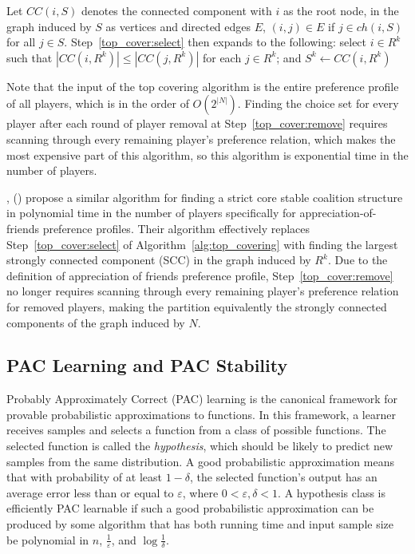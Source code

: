\documentclass[letterpaper]{article} %
\newcommand{\citename}[1]{\citeauthor{#1}, (\citeyear{#1})}
\newcommand{\ch}{\mathit{ch}}
\newcommand{\CC}{\mathit{CC}}
\theoremstyle{definition}
\begin{document}
Let $\CC(i, S)$ denotes the connected component with $i$ as the root node,
in the graph induced by $S$ as vertices and directed edges $E$,
$(i, j) \in E$ if $j \in \ch(i, S)$ for all $j \in S$.
Step~\ref{top_cover:select} then expands to the following: select $i\in R^k$ such that $|\CC(i,R^k)| \leq |\CC(j,R^k)|$ for each $j\in R^k$; and $S^k\leftarrow \CC(i,R^k)$

Note that the input of the top covering algorithm is the entire preference profile of all players, which is in the order of $O(2^{|N|})$. Finding the choice set for every player after each round of player removal at Step~\ref{top_cover:remove} requires scanning through every remaining player's preference relation, which makes the most expensive part of this algorithm, so this algorithm is exponential time in the number of players.

\citename{Dimitrov2006} propose a similar algorithm for finding a strict core stable coalition structure in polynomial time in the number of players specifically for appreciation-of-friends preference profiles. Their algorithm effectively replaces Step~\ref{top_cover:select} of Algorithm~\ref{alg:top_covering} with finding the largest strongly connected component (SCC) in the graph induced by $R^k$. Due to the definition of appreciation of friends preference profile, Step~\ref{top_cover:remove} no longer requires scanning through every remaining player's preference relation for removed players, making the partition equivalently the strongly connected components of the graph induced by $N$.

\subsection{PAC Learning and PAC Stability}
Probably Approximately Correct (PAC) learning is the canonical framework for provable probabilistic approximations to functions. In this framework, a learner receives samples and selects a function from a class of possible functions. The selected function is called the {\it hypothesis}, which should be likely to predict new samples from the same distribution. A good probabilistic approximation means that with probability of at least $1 - \delta$, the selected function's output has an average error less than or equal to $\varepsilon$, where $0 < \varepsilon, \delta < 1$. A hypothesis class is efficiently PAC learnable if such a good probabilistic approximation can be produced by some algorithm that has both running time and input sample size be polynomial in $n$, $\frac{1}{\varepsilon}$, and $\log{\frac{1}{\delta}}$.
\end{document}
